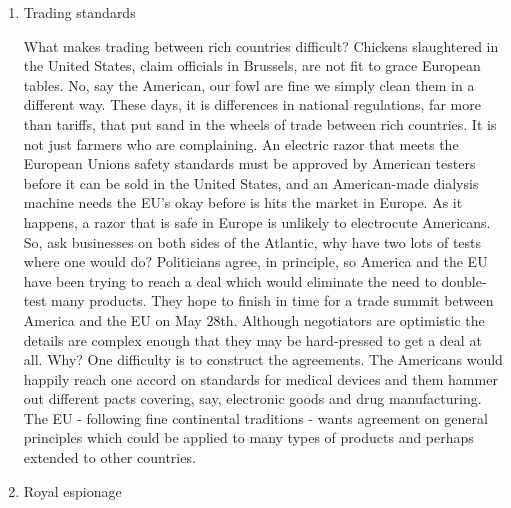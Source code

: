 \begin{enumerate}
\item Trading standards

What makes trading between rich countries difficult? Chickens slaughtered in the United States, claim officials in Brussels, are not fit to grace European tables.
No, say the American, our fowl are fine we simply clean them in a different way.
These days, it is differences in national regulations, far more than tariffs, that put sand in the wheels of trade between rich countries.
It is not just farmers who are complaining.
An electric razor that meets the European Unions safety standards must be approved by American testers before it can be sold in the United States, and an American-made dialysis machine needs the EU's okay before is hits the market in Europe.
As it happens, a razor that is safe in Europe is unlikely to electrocute Americans.
So, ask businesses on both sides of the Atlantic, why have two lots of tests where one would do? Politicians agree, in principle, so America and the EU have been trying to reach a deal which would eliminate the need to double-test many products.
They hope to finish in time for a trade summit between America and the EU on May 28th.
Although negotiators are optimistic the details are complex enough that they may be hard-pressed to get a deal at all.
Why? One difficulty is to construct the agreements.
The Americans would happily reach one accord on standards for medical devices and them hammer out different pacts covering, say, electronic goods and drug manufacturing.
The EU - following fine continental traditions - wants agreement on general principles which could be applied to many types of products and perhaps extended to other countries.
\item  Royal espionage


\end{enumerate}
